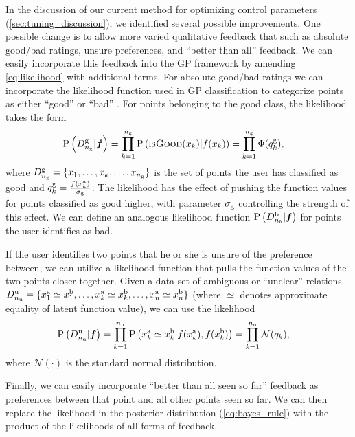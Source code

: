 In the discussion of our current method for optimizing control parameters
(\cref{sec:tuning_discussion}), we identified several possible improvements.
One possible change is to allow more varied qualitative feedback that such as
absolute good/bad ratings, unsure preferences, and ``better than all'' feedback.
We can easily incorporate this feedback into the GP framework by amending
\cref{eq:likelihood} with additional terms. For absolute good/bad ratings we can
incorporate the likelihood function used in GP classification to categorize
points as either ``good'' or ``bad'' \citep{williams2006gaussian}. For points
belonging to the good class, the likelihood takes the form
\begin{align}
    \prob{D_{n_\tn{g}}^\tn{g}|\vecf{f}} &= 
        \prod_{k=1}^{n_\tn{g}} \prob{\textsc{isGood}(x_k)| f(x_k)} 
        = \prod_{k=1}^{n_\tn{g}} \Phi(q_k^\tn{g}),
    \label{eq:likelihood_abs_good}
\end{align}
where $D_{n_{\mathrm{g}}}^{\mathrm{g}} = \{x_1, \ldots, x_k, \ldots, x_{n_{\mathrm{g}}}\}$ is the
set of points the user has classified as good and $q_k^{\mathrm{g}} =
\frac{f(x_k^{\mathrm{a}})}{\sigma_{\mathrm{g}}}$. The likelihood has the effect of pushing
the function values for points classified as good higher, with parameter
$\sigma_{\mathrm{g}}$ controlling the strength of this effect. We can define an
analogous likelihood function $\prob{D_{n_b}^\tn{b}|\vecf{f}}$ for points the
user identifies as bad.

If the user identifies two points that he or she is unsure of the preference
between, we can utilize a likelihood function that pulls the function values of
the two points closer together. Given a data set of ambiguous or ``unclear''
relations $D_{n_{\mathrm{u}}}^{\mathrm{u}} = \{x_1^{\mathrm{a}} \simeq x_1^{\mathrm{b}}, \ldots,
x_k^{\mathrm{a}} \simeq x_k^{\mathrm{b}}, \ldots, x_n^{\mathrm{a}} \simeq x_n^{\mathrm{b}}\}$ (where
$\simeq$ denotes approximate equality of latent function value), we can use the
likelihood
\begin{align}
    \prob{D_{n_\tn{u}}^\tn{u}|\vecf{f}} &= \prod_{k=1}^{n_\tn{u}} \prob{x_k^\tn{a}
        \simeq x_k^\tn{b} | f(x_k^\tn{a}), f(x_k^\tn{b})} 
        = \prod_{k=1}^{n_\tn{u}} \mathcal{N}(q_k),
    \label{eq:likelihood_unclear}
\end{align}
where $\mathcal{N}(\cdot)$ is the standard normal distribution.

Finally, we can easily incorporate ``better than all seen so far'' feedback as
preferences between that point and all other points seen so far. We can then
replace the likelihood in the posterior distribution (\cref{eq:bayes_rule}) with
the product of the likelihoods of all forms of feedback.


